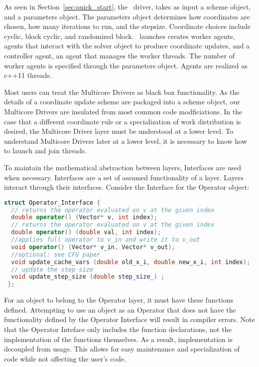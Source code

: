 As seen in Section~\ref{sec:quick_start}, the \pkg~driver, takes as input a scheme object, and a parameters object.
The parameters object determines how coordinates are chosen, how many iterations to run, and the stepsize.
Coordinate choices include cyclic, block cyclic, and randomized block. 
\pkg~launches creates  worker agents, agents that interact with the solver object to produce coordinate updates, and a controller agent, an agent that manages the worker threads.
The number of worker agents is specified through the parameters object.
Agents are realized as c++11 threads.

Most users can treat the Multicore Drivers as black box functionality.
As the details of a coordinate update scheme are packaged into a scheme object, our Multicore Drivers are insulated from most common code modficiations.
In the case that a different coordinate rule or a specialization of work distribution is desired, the Multicore Driver layer must be understood at a lower level.
To understand  Multicore Drivers later at a lower level, it is necessary to know how to launch and join threads.

To maintain the mathematical abstraction between layers, Interfaces are used when necessary. 
Interfaces are a set of assumed functionality of a layer.
Layers interact through their interfaces.
Consider the Interface for the Operator object:

\begin{lstlisting}[language=C++,label={Operator_Interface}]
struct Operator_Interface {
  // returns the operator evaluated on v at the given index
  double operator() (Vector* v, int index);
  // returns the operator evaluated on v at the given index
  double operator() (double val, int index);
  //applies full operator to v_in and write it to v_out
  void operator() (Vector* v_in, Vector* v_out);
  //optional: see CFU paper
  void update_cache_vars (double old_x_i, double new_x_i, int index);
  // update the step size
  void update_step_size (double step_size_) ;
 };
\end{lstlisting}

For an object to belong to the Operator layer, it must have these functions defined.
Attempting to use an object as an Operator that does not have the functionality defined by the Operator Interface will result in compiler errors.
Note that the Operator Inteface only includes the function declarations, not the implementation of the functions themselves.
As a result, implementation is decoupled from usage.
This allows for easy maintenance and specialization of code while not affecting the user's code.


